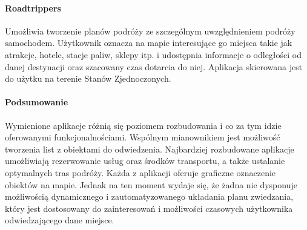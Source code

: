 \paragraph{Roadtrippers}

Umożliwia tworzenie planów podróży ze szczególnym uwzględnieniem podróży samochodem. 
Użytkownik oznacza na mapie interesujące go miejsca takie jak atrakcje, hotele, stacje paliw, sklepy itp. 
i udostępnia informacje o odległości od danej destynacji oraz szacowany czas dotarcia do niej. 
Aplikacja skierowana jest do użytku na terenie Stanów Zjednoczonych.

\paragraph{Podsumowanie}

Wymienione aplikacje różnią się poziomem rozbudowania i co za tym idzie oferowanymi funkcjonalnościami. 
Wspólnym mianownikiem jest możliwość tworzenia list z obiektami do odwiedzenia. Najbardziej rozbudowane aplikacje 
umożliwiają rezerwowanie usług oraz środków transportu, a także ustalanie optymalnych tras podróży. Każda z aplikacji 
oferuje graficzne oznaczenie obiektów na mapie. Jednak na ten moment wydaje się, że żadna nie dysponuje możliwością dynamicznego 
i zautomatyzowanego układania planu zwiedzania, który jest dostosowany do zainteresowań i możliwości czasowych użytkownika 
odwiedzającego dane miejsce.